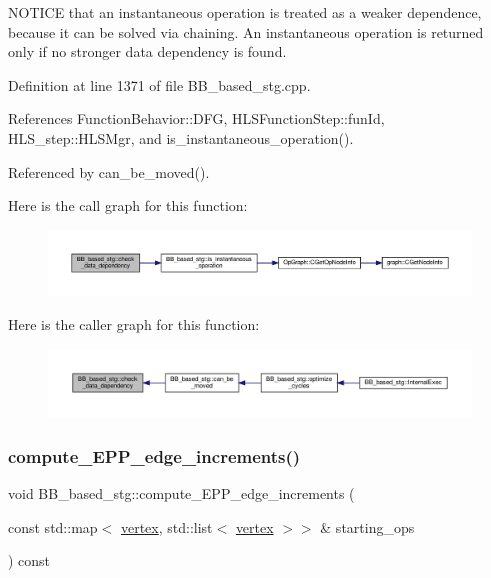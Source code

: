 N\+O\+T\+I\+CE that an instantaneous operation is treated as a weaker dependence, because it can be solved via chaining. An instantaneous operation is returned only if no stronger data dependency is found. 

Definition at line 1371 of file B\+B\+\_\+based\+\_\+stg.\+cpp.



References Function\+Behavior\+::\+D\+FG, H\+L\+S\+Function\+Step\+::fun\+Id, H\+L\+S\+\_\+step\+::\+H\+L\+S\+Mgr, and is\+\_\+instantaneous\+\_\+operation().



Referenced by can\+\_\+be\+\_\+moved().

Here is the call graph for this function\+:
\nopagebreak
\begin{figure}[H]
\begin{center}
\leavevmode
\includegraphics[width=350pt]{dd/d84/classBB__based__stg_a37ff05a95b3cae65fe5779a3590a52fb_cgraph}
\end{center}
\end{figure}
Here is the caller graph for this function\+:
\nopagebreak
\begin{figure}[H]
\begin{center}
\leavevmode
\includegraphics[width=350pt]{dd/d84/classBB__based__stg_a37ff05a95b3cae65fe5779a3590a52fb_icgraph}
\end{center}
\end{figure}
\mbox{\label{classBB__based__stg_a6d31e33f5c5a4cbd01e673e4c81310da}} 
\subsubsection{\texorpdfstring{compute\+\_\+\+E\+P\+P\+\_\+edge\+\_\+increments()}{compute\_EPP\_edge\_increments()}}
{\footnotesize\ttfamily void B\+B\+\_\+based\+\_\+stg\+::compute\+\_\+\+E\+P\+P\+\_\+edge\+\_\+increments (\begin{DoxyParamCaption}\item[{const std\+::map$<$ \hyperlink{graph_8hpp_abefdcf0544e601805af44eca032cca14}{vertex}, std\+::list$<$ \hyperlink{graph_8hpp_abefdcf0544e601805af44eca032cca14}{vertex} $>$$>$ \&}]{starting\+\_\+ops }\end{DoxyParamCaption}) const\hspace{0.3cm}{\ttfamily [private]}}



